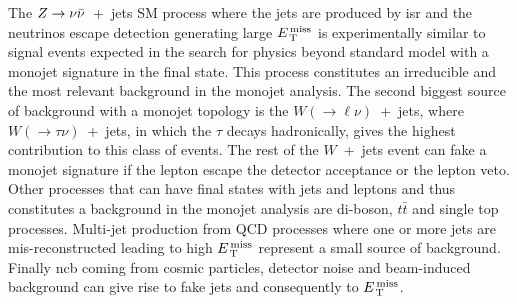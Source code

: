 The $Z \rightarrow \nu \bar{\nu}$~+~jets SM process where the jets are produced by \gls{isr} and the
neutrinos escape detection generating large $E_\mathrm{\, T}^\mathrm{\, miss}$ is experimentally similar to
signal events expected in the search for physics beyond standard model with a
monojet signature in the final state. This process constitutes an irreducible
and the most relevant background in the monojet analysis. The second biggest
source of background with a monojet topology is the
$W (\rightarrow \ell \nu)$~+~jets, where $W (\rightarrow \tau \nu)$~+~jets, in
which the $\tau$ decays hadronically, gives the highest contribution to this
class of events. The rest of the $W$~+~jets event can fake a monojet signature
if the lepton escape the detector acceptance or the lepton veto. Other processes
that can have final states with jets and leptons and thus constitutes a
background in the monojet analysis are di-boson, $t \bar{t}$ and single top
processes. Multi-jet production from QCD processes where one or more jets are
mis-reconstructed leading to high $E_\mathrm{\, T}^\mathrm{\, miss}$ represent a small source of
background. Finally \gls{ncb} coming from cosmic particles, detector noise and
beam-induced background can give rise to fake jets and consequently to $E_\mathrm{\, T}^\mathrm{\, miss}$.
